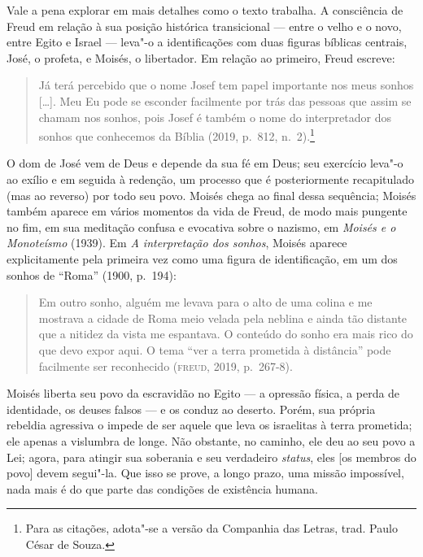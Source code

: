 Vale a pena explorar em mais detalhes como o texto trabalha. A
consciência de Freud em relação à sua posição histórica transicional ---
entre o velho e o novo, entre Egito e Israel --- leva"-o a identificações
com duas figuras bíblicas centrais, José, o profeta, e Moisés, o
libertador. Em relação ao primeiro, Freud escreve:

\begin{quote}
Já terá percebido que o nome Josef tem papel importante nos meus sonhos
{[}\ldots{}{]}. Meu Eu pode se esconder facilmente por trás das pessoas que
assim se chamam nos sonhos, pois Josef é também o nome do interpretador
dos sonhos que conhecemos da Bíblia (2019, p.~812, n.~2).\footnote{Para as citações, adota"-se a versão da Companhia das Letras, trad. Paulo César de Souza.}
\end{quote}

O dom de José vem de Deus e depende da sua fé em Deus; seu exercício
leva"-o ao exílio e em seguida à redenção, um processo que é
posteriormente recapitulado (mas ao reverso) por todo seu povo. Moisés
chega ao final dessa sequência; Moisés também aparece em vários momentos
da vida de Freud, de modo mais pungente no fim, em sua meditação confusa
e evocativa sobre o nazismo, em \emph{Moisés e o Monoteísmo} (1939).
Em \emph{A interpretação dos sonhos}, Moisés aparece
explicitamente pela primeira vez como uma figura de identificação, em um
dos sonhos de ``Roma'' (1900, p.~194):

\begin{quote}
Em outro sonho, alguém me levava para o alto de uma colina e me mostrava
a cidade de Roma meio velada pela neblina e ainda tão distante que a
nitidez da vista me espantava. O conteúdo do sonho era mais rico do que
devo expor aqui. O tema ``ver a terra prometida à distância'' pode
facilmente ser reconhecido (\textsc{freud}, 2019, p.~267-8).
\end{quote}

Moisés liberta seu povo da escravidão no Egito --- a opressão física, a
perda de identidade, os deuses falsos --- e os conduz ao deserto. Porém,
sua própria rebeldia agressiva o impede de ser aquele que leva os
israelitas à terra prometida; ele apenas a vislumbra de longe. Não
obstante, no caminho, ele deu ao seu povo a Lei; agora, para atingir sua
soberania e seu verdadeiro \emph{status}, eles {[}os membros do povo{]}
devem segui"-la. Que isso se prove, a longo prazo, uma missão impossível,
nada mais é do que parte das condições de existência humana.

